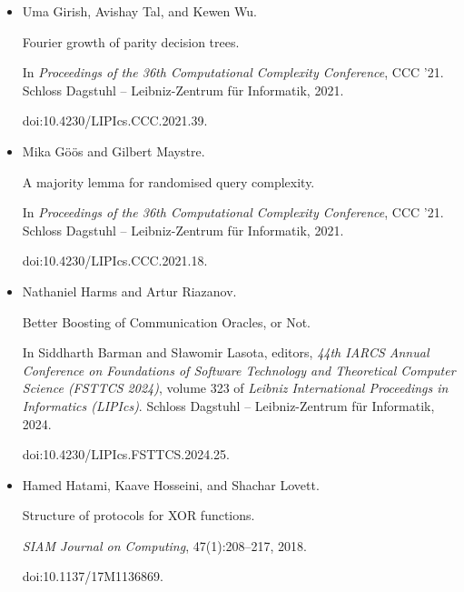 \documentclass[10pt,a4paper]{article}
\begin{document}
\begin{itemize}
doi:10.1109/FOCS57990.2023.00047.





\item[] 
[28]

Uma Girish, Avishay Tal, and Kewen Wu.


Fourier growth of parity decision trees.


In \emph{Proceedings of the 36th Computational Complexity Conference},
CCC ’21. Schloss Dagstuhl – Leibniz-Zentrum für Informatik, 2021.


doi:10.4230/LIPIcs.CCC.2021.39.





\item[] 
[29]

Mika Göös and Gilbert Maystre.


A majority lemma for randomised query complexity.


In \emph{Proceedings of the 36th Computational Complexity Conference},
CCC ’21. Schloss Dagstuhl – Leibniz-Zentrum für Informatik, 2021.


doi:10.4230/LIPIcs.CCC.2021.18.





\item[] 
[30]

Nathaniel Harms and Artur Riazanov.


Better Boosting of Communication Oracles, or Not.


In Siddharth Barman and Sławomir Lasota, editors, \emph{44th IARCS
Annual Conference on Foundations of Software Technology and Theoretical
Computer Science (FSTTCS 2024)}, volume 323 of \emph{Leibniz International
Proceedings in Informatics (LIPIcs)}. Schloss Dagstuhl – Leibniz-Zentrum
für Informatik, 2024.


doi:10.4230/LIPIcs.FSTTCS.2024.25.





\item[] 
[31]

Hamed Hatami, Kaave Hosseini, and Shachar Lovett.


Structure of protocols for XOR functions.


\emph{SIAM Journal on Computing}, 47(1):208–217, 2018.


doi:10.1137/17M1136869.






\end{itemize}
\end{document}
